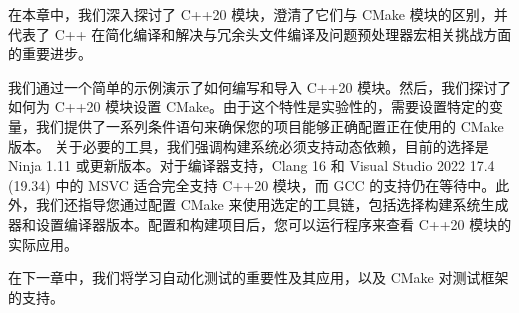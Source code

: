 在本章中，我们深入探讨了 C++20 模块，澄清了它们与 CMake 模块的区别，并代表了 C++ 在简化编译和解决与冗余头文件编译及问题预处理器宏相关挑战方面的重要进步。

我们通过一个简单的示例演示了如何编写和导入 C++20 模块。然后，我们探讨了如何为 C++20 模块设置 CMake。由于这个特性是实验性的，需要设置特定的变量，我们提供了一系列条件语句来确保您的项目能够正确配置正在使用的 CMake 版本。 关于必要的工具，我们强调构建系统必须支持动态依赖，目前的选择是 Ninja 1.11 或更新版本。对于编译器支持，Clang 16 和 Visual Studio 2022 17.4 (19.34) 中的 MSVC 适合完全支持 C++20 模块，而 GCC 的支持仍在等待中。此外，我们还指导您通过配置 CMake 来使用选定的工具链，包括选择构建系统生成器和设置编译器版本。配置和构建项目后，您可以运行程序来查看 C++20 模块的实际应用。

在下一章中，我们将学习自动化测试的重要性及其应用，以及 CMake 对测试框架的支持。